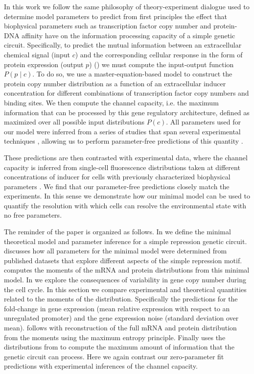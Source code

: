 In this work we follow the same philosophy of theory-experiment dialogue used to
determine model parameters to predict from first principles the effect that
biophysical parameters such as transcription factor copy number and protein-DNA
affinity have on the information processing capacity of a simple genetic
circuit. Specifically, to predict the mutual information between an
extracellular chemical signal (input $c$) and the corresponding cellular
response in the form of protein expression (output $p$) ()
we must compute the input-output function $P(p \mid c)$. To do so, we use a
master-equation-based model to construct the protein copy number distribution as
a function of an extracellular inducer concentration for different combinations
of transcription factor copy numbers and binding sites. We then compute the
channel capacity, i.e. the maximum information that can be processed by this
gene regulatory architecture, defined as  maximized over
all possible input distributions $P(c)$. All parameters used for our model were
inferred from a series of studies that span several experimental techniques
\cite{Garcia2011c, Jones2014a, Brewster2014, Razo-Mejia2018}, allowing us to
perform parameter-free predictions of this quantity \cite{Phillips2019}.

These predictions are then contrasted with experimental data, where the channel
capacity is inferred from single-cell fluorescence distributions taken at
different concentrations of inducer for cells with previously characterized
biophysical parameters \cite{Garcia2011c, Razo-Mejia2018}. We find that our
parameter-free predictions closely match the experiments. In this sense we
demonstrate how our minimal model can be used to quantify the resolution with
which cells can resolve the environmental state with no free parameters.

The reminder of the paper is organized as follows. In  we
define the minimal theoretical model and parameter inference for a simple
repression genetic circuit.  discusses how all parameters for
the minimal model were determined from published datasets that explore different
aspects of the simple repression motif.  computes the
moments of the mRNA and protein distributions from this minimal model. In
 we explore the consequences of variability in gene copy
number during the cell cycle. In this section we compare experimental and
theoretical quantities related to the moments of the distribution. Specifically
the predictions for the fold-change in gene expression (mean relative expression
with respect to an unregulated promoter) and the gene expression noise (standard
deviation over mean).  follows with reconstruction of the
full mRNA and protein distribution from the moments using the maximum entropy
principle. Finally  uses the distributions from
 to compute the maximum amount of information that the
genetic circuit can process. Here we again contrast our zero-parameter fit
predictions with experimental inferences of the channel capacity.


